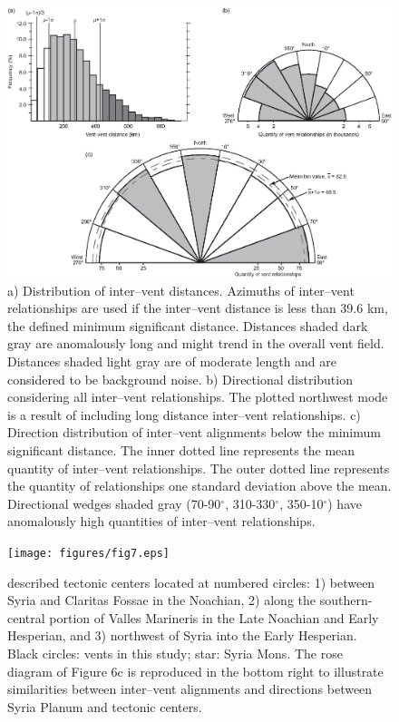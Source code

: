 \begin{figure}
\noindent\includegraphics{figures/fig6.eps}
\caption{a) Distribution of inter--vent distances. Azimuths of inter--vent relationships are used if the inter--vent distance is less than 39.6 km, the defined minimum significant distance. Distances shaded dark gray are anomalously long and might trend in the overall vent field. Distances shaded light gray are of moderate length and are considered to be background noise. b) Directional distribution considering all inter--vent relationships. The plotted northwest mode is a result of including long distance inter--vent relationships. c) Direction distribution of inter--vent alignments below the minimum significant distance. The inner dotted line represents the mean quantity of inter--vent relationships. The outer dotted line represents the quantity of relationships one standard deviation above the mean. Directional wedges shaded gray (70-90$^{\circ}$, 310-330$^{\circ}$, 350-10$^{\circ}$) have anomalously high quantities of inter--vent relationships.}
\label{fig-azgraphs}
\end{figure}

\begin{figure}
\noindent\texttt{[image: figures/fig7.eps]}
\caption{\citet{Anderson2001} described tectonic centers located at numbered circles: 1) between Syria and Claritas Fossae in the Noachian, 2) along the southern-central portion of Valles Marineris in the Late Noachian and Early Hesperian, and 3) northwest of Syria into the Early Hesperian. Black circles: vents in this study; star: Syria Mons. The rose diagram of Figure 6c is reproduced in the bottom right to illustrate similarities between inter--vent alignments and directions between Syria Planum and tectonic centers.}
\label{fig-andersoncenters}
\end{figure}
